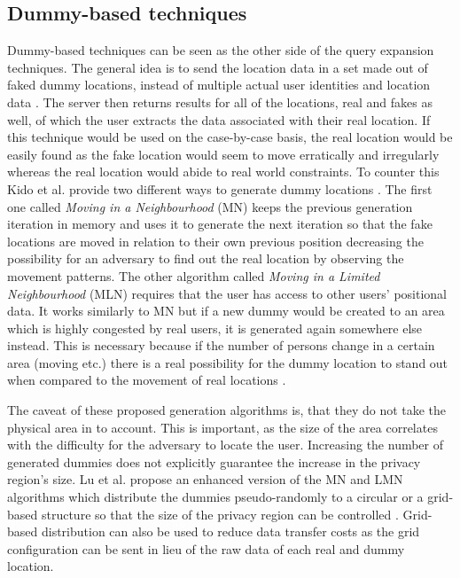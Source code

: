 \documentclass[english]{tktltiki2}
\theoremstyle{definition}
\theoremstyle{remark}
\begin{document}
\subsection{Dummy-based techniques}

Dummy-based techniques can be seen as the other side of the query expansion techniques. The general idea is to send the location data in a set made out of faked dummy locations, instead of multiple actual user identities and location data \cite{Kido2005}. The server then returns results for all of the locations, real and fakes as well, of which the user extracts the data associated with their real location. If this technique would be used on the case-by-case basis, the real location would be easily found as the fake location would seem to move erratically and irregularly whereas the real location would abide to real world constraints. To counter this Kido et al. provide two different ways to generate dummy locations \cite{Kido2005}. The first one called \textit{Moving in a Neighbourhood} (MN) keeps the previous generation iteration in memory and uses it to generate the next iteration so that the fake locations are moved in relation to their own previous position decreasing the possibility for an adversary to find out the real location by observing the movement patterns. The other algorithm called \textit{Moving in a Limited Neighbourhood} (MLN) requires that the user has access to other users' positional data. It works similarly to MN but if a new dummy would be created to an area which is highly congested by real users, it is generated again somewhere else instead. This is necessary because if the number of persons change in a certain area (moving etc.) there is a real possibility for the dummy location to stand out when compared to the movement of real locations \cite{Kido2005}. \par
The caveat of these proposed generation algorithms is, that they do not take the physical area in to account. This is important, as the size of the area correlates with the difficulty for the adversary to locate  the user. Increasing the number of generated dummies does not explicitly guarantee the increase in the privacy region's size. Lu et al. propose an enhanced version of the MN and LMN algorithms which distribute the dummies pseudo-randomly to a circular or a grid-based structure so that the size of the privacy region can be controlled \cite{Lu2008}. Grid-based distribution can also be used to reduce data transfer costs as the grid configuration can be sent in lieu of the raw data of each real and dummy location.
\end{document}
